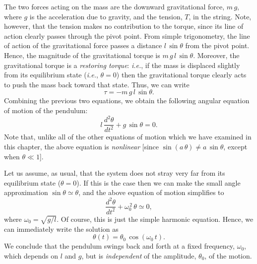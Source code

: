The two forces acting on the mass are the downward gravitational force, $m\,g$, where $g$ is the acceleration due to gravity, 
 and the tension, $T$, in the string.
Note, however, that the tension makes no contribution to the torque, 
since its line of action clearly passes
through the pivot point. From simple trigonometry, 
the line of action of the gravitational force passes a distance $l\,\sin\theta$ 
from the
pivot point. Hence, the magnitude of the gravitational torque is $m\,g\,l\,
\sin\theta$.
Moreover, the gravitational torque is  a {\em restoring torque}: {\em i.e.}, if 
the mass is
displaced slightly from its equilibrium state ({\em i.e.}, $\theta =0$) then the
 gravitational torque clearly acts
 to push the mass back toward that state. Thus, we can write
\begin{equation}
\tau = - m\,g\,l\,\sin\theta.
\end{equation}
Combining the previous two equations, we obtain the following  angular equation 
of motion of the pendulum:
\begin{equation}\label{epend}
l\,\frac{d^2{\theta}}{dt^2} +g\,\sin\theta=0.
\end{equation}
Note that, unlike all of the other equations of motion which we have
examined in this chapter, the above equation is {\em nonlinear} [since $\sin(a\,\theta)\neq a\,\sin\theta$, except when $\theta\ll 1$].

Let us assume, as usual, that the system does not stray very far from
its equilibrium state ($\theta=0$). If this is the case then we
can make the small angle approximation $\sin\theta\simeq \theta$, and
the above equation of motion simplifies to
\begin{equation}
\frac{d^2\theta}{dt^2} + \omega_0^{\,2}\,\theta\simeq 0,
\end{equation}
where $\omega_0 = \sqrt{g/l}$. Of course, this is just the
simple harmonic equation. Hence, we can immediately write the solution
as
\begin{equation}\label{e4.64}
\theta(t) = \theta_0\,\cos(\omega_0\,t).
\end{equation}
We conclude that the pendulum swings back and forth at a fixed frequency, $\omega_0$, which depends on $l$ and $g$, but is {\em independent}\/ of the amplitude,
$\theta_0$, of the motion.

